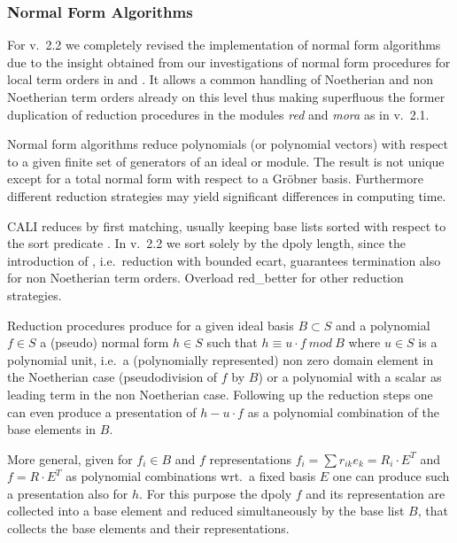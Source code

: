 \subsubsection{Normal Form Algorithms}

For v.\ 2.2 we completely revised the implementation of normal form
algorithms due to the insight obtained from our investigations of
normal form procedures for local term orders in \cite{Graebe:95a} and
\cite{Graebe:94}. It allows a common handling of Noetherian and non
Noetherian term orders already on this level thus making superfluous
the former duplication of reduction procedures in the modules {\em
red} and \emph{mora} as in v.\ 2.1.
\medskip

Normal form algorithms reduce polynomials (or polynomial vectors)
with respect to a given finite set of generators of an ideal or
module. The result is not unique except for a total normal form with
respect to a Gr\"obner basis. Furthermore different reduction strategies
may yield significant differences in computing time.

CALI reduces by first matching, usually keeping base lists sorted
with respect to the sort predicate . In v.\ 2.2 we
sort solely by the dpoly length, since the introduction of
, i.e.\ reduction with bounded ecart, guarantees
termination also for non Noetherian term orders. Overload red\_better
for other reduction strategies. 
\medskip

Reduction procedures produce for a given ideal basis $B\subset S$ and
a polynomial $f\in S$ a (pseudo) normal form $h\in S$ such that
$h\equiv u\cdot f\ mod\ B$ where $u\in S$ is a polynomial unit, i.e.\
a (polynomially represented) non zero domain element in the Noetherian
case (pseudodivision of $f$ by $B$) or a polynomial with a scalar as
leading term in the non Noetherian case. Following up the reduction
steps one can even produce a presentation of $h-u\cdot f$ as a
polynomial combination of the base elements in $B$.

More general, given for $f_i\in B$ and $f$ representations $f_i =
\sum{r_{ik}e_k} = R_i\cdot E^T$ and $f=R\cdot E^T$ as polynomial
combinations wrt.\ a fixed basis $E$ one can produce such a
presentation also for $h$. For this purpose the dpoly $f$ and its
representation are collected into a base element and reduced
simultaneously by the base list $B$, that collects the base elements
and their representations. 
\medskip

